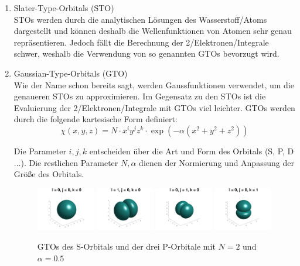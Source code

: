 \begin{enumerate}
    \item Slater-Type-Orbitals (STO)\\
    STOs werden durch die analytischen Lösungen des Wasserstoff\-/Atoms dargestellt
    und können deshalb die Wellenfunktionen von Atomen sehr genau repräsentieren.
    Jedoch fällt die Berechnung der 2\-/Elektronen\-/Integrale schwer,
    weshalb die Verwendung von so genannten GTOs bevorzugt wird.

    \cite[Ab. 5.2]{cramer_2004}
    \cite[S. 2]{tc2_6}

    \item Gaussian-Type-Orbitals (GTO)\\
    Wie der Name schon bereits sagt, werden Gaussfunktionen verwendet,
    um die genaueren STOs zu approximieren. Im Gegensatz zu den STOs ist
    die Evaluierung der 2\-/Elektronen\-/Integrale mit GTOs viel leichter.
    GTOs werden durch die folgende kartesische Form definiert:\\
    \begin{equation}\label{gto-function}
        \chi(x,y,z) = N \cdot x^i y^j z^k \cdot \exp (-\alpha (x^2+y^2+z^2))
    \end{equation}

    Die Parameter $i,j,k$ entscheiden über die Art und Form des Orbitals (S, P, D ...).
    Die restlichen Parameter $N, \alpha$ dienen der Normierung und Anpassung der Größe des Orbitals.

    \begin{figure}[H]
        \includegraphics[trim=50 0 50 0, clip, width=0.24\textwidth]{res/GTOs/ao_0_0_0.png}
        \includegraphics[trim=50 0 50 0, clip, width=0.24\textwidth]{res/GTOs/ao_1_0_0.png}
        \includegraphics[trim=50 0 50 0, clip, width=0.24\textwidth]{res/GTOs/ao_0_1_0.png}
        \includegraphics[trim=50 0 50 0, clip, width=0.24\textwidth]{res/GTOs/ao_0_0_1.png}
        \caption{GTOs des S-Orbitals und der drei P-Orbitale mit $N=2$ und $\alpha = 0.5$}
    \end{figure}


\end{enumerate}
